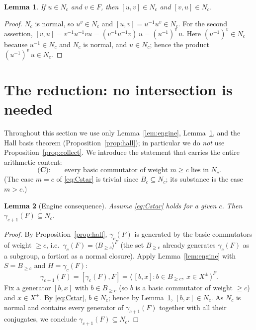 \documentclass{amsart}
\newtheorem{lemma}{Lemma}
\theoremstyle{definition}
\theoremstyle{remark}
\begin{document}
\begin{lemma}\label{lem:caseA}
If $u\in N_c$ and $v\in F$, then $[u,v]\in N_c$ and $[v,u]\in N_c$.
\end{lemma}

\begin{proof}
$N_c$ is normal, so $u^{v}\in N_c$ and $[u,v]=u^{-1}u^{v}\in N_c$. For the second
assertion, $[v,u]=v^{-1}u^{-1}vu=(v^{-1}u^{-1}v)\,u=(u^{-1})^{v}\,u$. Here
$(u^{-1})^{v}\in N_c$ because $u^{-1}\in N_c$ and $N_c$ is normal, and $u\in N_c$;
hence the product $(u^{-1})^{v}\,u\in N_c$.
\end{proof}

\section{The reduction: no intersection is needed}\label{sec:reduction}

Throughout this section we use only Lemma~\ref{lem:engine},
Lemma~\ref{lem:caseA}, and the Hall basis theorem
(Proposition~\ref{prop:hall}); in particular we do \emph{not} use
Proposition~\ref{prop:collect}. We introduce the statement that carries the
entire arithmetic content:
\begin{equation}\label{eq:Cstar}
\textbf{(C):}\qquad
\text{every basic commutator of weight }m\ge c\text{ lies in }N_c .
\end{equation}
(The case $m=c$ of \eqref{eq:Cstar} is trivial since $B_c\subseteq N_c$; its
substance is the case $m>c$.)

\begin{lemma}[Engine consequence]\label{lem:Acoll}
Assume \eqref{eq:Cstar} holds for a given $c$. Then $\gamma_{c+1}(F)\subseteq N_c$.
\end{lemma}

\begin{proof}
By Proposition~\ref{prop:hall}, $\gamma_c(F)$ is generated by the basic
commutators of weight $\ge c$, i.e.\ $\gamma_c(F)=\langle B_{\ge c}\rangle^{F}$
(the set $B_{\ge c}$ already generates $\gamma_c(F)$ as a subgroup, a fortiori as
a normal closure). Apply Lemma~\ref{lem:engine} with $S=B_{\ge c}$ and
$H=\gamma_c(F)$:
\[
\gamma_{c+1}(F)=[\gamma_c(F),F]
=\big\langle\,[b,x] : b\in B_{\ge c},\ x\in X^{\pm}\,\big\rangle^{F}.
\]
Fix a generator $[b,x]$ with $b\in B_{\ge c}$ (so $b$ is a basic commutator of
weight $\ge c$) and $x\in X^{\pm}$. By \eqref{eq:Cstar}, $b\in N_c$; hence by
Lemma~\ref{lem:caseA}, $[b,x]\in N_c$. As $N_c$ is normal and contains every
generator of $\gamma_{c+1}(F)$ together with all their conjugates, we conclude
$\gamma_{c+1}(F)\subseteq N_c$.
\end{proof}
\end{document}
